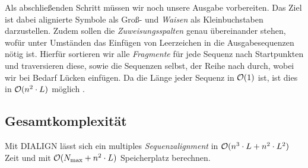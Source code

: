 Als abschließenden Schritt müssen wir noch unsere Ausgabe vorbereiten. Das Ziel ist dabei alignierte Symbole als Groß- und \emph{Waisen} als Kleinbuchstaben darzustellen. Zudem sollen die \emph{Zuweisungsspalten} genau übereinander stehen, wofür unter Umständen das Einfügen  von Leerzeichen in die Ausgabesequenzen nötig ist. Hierfür sortieren wir alle \emph{Fragmente} für jede Sequenz nach Startpunkten und traversieren diese, sowie die Sequenzen selbst, der Reihe nach durch, wobei wir bei Bedarf Lücken einfügen. Da die Länge jeder Sequenz in $\mathcal{O}(1)$ ist, ist dies in $\mathcal{O}(n^2\cdot L)$ möglich \citep{m99}.



\subsection{Gesamtkomplexität}

\begin{korollar}
	Mit DIALIGN	lässt sich ein multiples \emph{Sequenzalignment} in $\mathcal{O}(n^3\cdot L + n^2\cdot L^2)$ Zeit und mit $\mathcal{O}(N_{\max} + n^2\cdot L)$ Speicherplatz berechnen.
\end{korollar}

